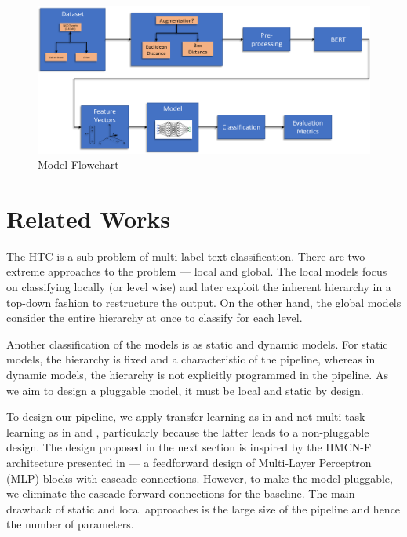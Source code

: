\documentclass[11pt,a4paper]{article}
\begin{document}

\begin{figure}
    \centering
    \includegraphics[scale=0.4]{Picture1.png}
    \caption{Model Flowchart}
    \label{fig:my_label}
\end{figure}


\section{Related Works}
The HTC is a sub-problem of multi-label text classification. There are two extreme approaches to the problem --- local and global. The local models focus on classifying locally (or level wise) and later exploit the inherent hierarchy in a top-down fashion to restructure the output. On the other hand, the global models consider the entire hierarchy at once to classify for each level.

Another classification of the models is as static and dynamic models. For static models, the hierarchy is fixed and a characteristic of the pipeline, whereas in dynamic models, the hierarchy is not explicitly programmed in the pipeline. As we aim to design a pluggable model, it must be local and static by design.

To design our pipeline, we apply transfer learning as in \cite{pmlr-v80-wehrmann18a} and not multi-task learning as in \cite{shimura-etal-2018-hft} and \cite{banerjee-etal-2019-hierarchical}, particularly because the latter leads to a non-pluggable design. The design proposed in the next section is inspired by the HMCN-F architecture presented in \cite{pmlr-v80-wehrmann18a} --- a feedforward design of Multi-Layer Perceptron (MLP) blocks with cascade connections. However, to make the model pluggable, we eliminate the cascade forward connections for the baseline. The main drawback of static and local approaches is the large size of the pipeline and hence the number of parameters.
\end{document}
